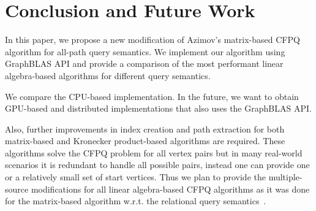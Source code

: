 \section{Conclusion and Future Work}
In this paper, we propose a new modification of Azimov's matrix-based CFPQ algorithm for all-path query semantics. We implement our algorithm using GraphBLAS API and provide a comparison of the most performant linear algebra-based algorithms for different query semantics. %

We compare the CPU-based implementation. In the future, we want to obtain GPU-based and distributed implementations that also uses the GraphBLAS API.

Also, further improvements in index creation and path extraction for both matrix-based and Kronecker product-based algorithms are required. These algorithms solve the CFPQ problem for all vertex pairs but in many real-world scenarios it is redundant to handle all possible pairs, instead one can provide one or a relatively small set of start vertices. Thus we plan to provide the multiple-source modifications for all linear algebra-based CFPQ algorithms as it was done for the matrix-based algorithm w.r.t. the relational query semantics~\cite{mscfpq}.